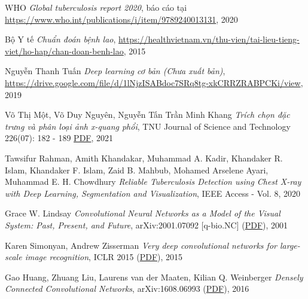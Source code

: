 \begin{thebibliography}{99}
	 WHO {\it Global tuberculosis report 2020}, báo cáo tại \href{https://www.who.int/publications/i/item/9789240013131}{ https://www.who.int/publications/i/item/9789240013131}, 2020
	
	 Bộ Y tế {\it Chuẩn đoán bệnh lao}, \href{https://healthvietnam.vn/thu-vien/tai-lieu-tieng-viet/ho-hap/chan-doan-benh-lao}{https://healthvietnam.vn/thu-vien/tai-lieu-tieng-viet/ho-hap/chan-doan-benh-lao}, 2015
	
	
	 Nguyễn Thanh Tuấn {\it Deep learning cơ bản (Chưa xuất bản)}, \href{https://drive.google.com/file/d/1lNjzISABdoc7SRq8tg-xkCRRZRABPCKi/view}{https://drive.google.com/file/d/1lNjzISABdoc7SRq8tg-xkCRRZRABPCKi/view}, 2019
	
	 Võ Thị Một, Võ Duy Nguyên, Nguyễn Tấn Trần Minh Khang {\it Trích chọn đặc trưng và phân loại ảnh x-quang phổi}, TNU Journal of Science and Technology 226(07): 182 - 189 {\href{http://jst.tnu.edu.vn/jst/article/viewFile/3974/pdf}{PDF}}, 2021
	
	 Tawsifur Rahman, Amith Khandakar, Muhammad A. Kadir, Khandaker R. Islam, Khandaker F. Islam, Zaid B. Mahbub, Mohamed Arselene Ayari, Muhammad E. H. Chowdhury {\it Reliable Tuberculosis Detection using Chest X-ray with Deep Learning, Segmentation and Visualization}, IEEE Access - Vol. 8, 2020
	
	 Grace W. Lindsay {\it Convolutional Neural Networks as a Model of the Visual System: Past, Present, and Future}, 	arXiv:2001.07092 [q-bio.NC] (\href{https://arxiv.org/ftp/arxiv/papers/2001/2001.07092.pdf}{PDF}), 2001
	
	 Karen Simonyan, Andrew Zisserman {\it Very deep convolutional networks for large-scale image recognition}, ICLR 2015 (\href{https://arxiv.org/pdf/1409.1556.pdf}{PDF}), 2015
	
	 Gao Huang, Zhuang Liu, Laurens van der Maaten, Kilian Q. Weinberger {\it Densely Connected Convolutional Networks}, arXiv:1608.06993 (\href{https://arxiv.org/pdf/1608.06993.pdf}{PDF}), 2016 
	  
\end{thebibliography}
